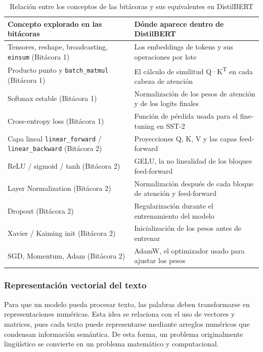 \documentclass[11pt,letterpaper]{article}
\begin{document}
	\begin{table}[H]
		\centering
		\caption{Relación entre los conceptos de las bitácoras y sus equivalentes en DistilBERT}
		\label{tab:relacion-bitacoras}
		\begin{tabular}{p{6.5cm}p{7cm}}
			\toprule
			Concepto explorado en las bitácoras & Dónde aparece dentro de DistilBERT \\
			\midrule
			Tensores, reshape, broadcasting, \texttt{einsum} (Bitácora 1) & Los embeddings de tokens y sus operaciones por lote \\
			Producto punto y \texttt{batch\_matmul} (Bitácora 1) & El cálculo de similitud Q·K\textsuperscript{T} en cada cabeza de atención \\
			Softmax estable (Bitácora 1) & Normalización de los pesos de atención y de los logits finales \\
			Cross-entropy loss (Bitácora 1) & Función de pérdida usada para el fine-tuning en SST-2 \\
			Capa lineal \texttt{linear\_forward} / \texttt{linear\_backward} (Bitácora 2) & Proyecciones Q, K, V y las capas feed-forward \\
			ReLU / sigmoid / tanh (Bitácora 2) & GELU, la no linealidad de los bloques feed-forward \\
			Layer Normalization (Bitácora 2) & Normalización después de cada bloque de atención y feed-forward \\
			Dropout (Bitácora 2) & Regularización durante el entrenamiento del modelo \\
			Xavier / Kaiming init (Bitácora 2) & Inicialización de los pesos antes de entrenar \\
			SGD, Momentum, Adam (Bitácora 2) & AdamW, el optimizador usado para ajustar los pesos \\
			\bottomrule
		\end{tabular}
	\end{table}
	
	\subsubsection{Representación vectorial del texto}
	
	Para que un modelo pueda procesar texto, las palabras deben transformarse en representaciones numéricas. Esta idea se relaciona con el uso de vectores y matrices, pues cada texto puede representarse mediante arreglos numéricos que condensan información semántica. De esta forma, un problema originalmente lingüístico se convierte en un problema matemático y computacional.
	
\end{document}
